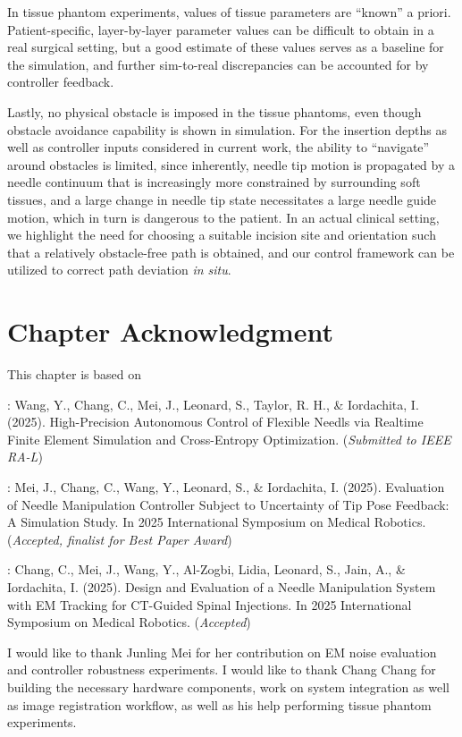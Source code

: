 In tissue phantom experiments, values of tissue parameters are ``known'' a priori. Patient-specific, layer-by-layer parameter values can be difficult to obtain in a real surgical setting, but a good estimate of these values serves as a baseline for the simulation, and further sim-to-real discrepancies can be accounted for by controller feedback.

Lastly, no physical obstacle is imposed in the tissue phantoms, even though obstacle avoidance capability is shown in simulation. For the insertion depths as well as controller inputs considered in current work, the ability to ``navigate'' around obstacles is limited, since inherently, needle tip motion is propagated by a needle continuum that is increasingly more constrained by surrounding soft tissues, and a large change in needle tip state necessitates a large needle guide motion, which in turn is dangerous to the patient. In an actual clinical setting, we highlight the need for choosing a suitable incision site and orientation such that a relatively obstacle-free path is obtained, and our control framework can be utilized to correct path deviation \textit{in situ}.

\section{Chapter Acknowledgment}
\label{sec:chap-5-ack}

This chapter is based on

\parencite{wangHighPrecisionAutonomousControl2025}: Wang, Y., Chang, C., Mei, J., Leonard, S., Taylor, R. H., \& Iordachita, I. (2025). High-Precision Autonomous Control of Flexible Needls via Realtime Finite Element Simulation and Cross-Entropy Optimization. (\textit{Submitted to IEEE RA-L})

\parencite{meiEvaluationNeedleManipulation2025}: Mei, J., Chang, C., Wang, Y., Leonard, S., \& Iordachita, I. (2025). Evaluation of Needle Manipulation Controller Subject to Uncertainty of Tip Pose Feedback: A Simulation Study. In 2025 International Symposium on Medical Robotics. (\textit{Accepted, finalist for Best Paper Award})

\parencite{changDesignEvaluationNeedle2025}: Chang, C., Mei, J., Wang, Y., Al-Zogbi, Lidia, Leonard, S., Jain, A., \& Iordachita, I. (2025). Design and Evaluation of a Needle Manipulation System with EM Tracking for CT-Guided Spinal Injections. In 2025 International Symposium on Medical Robotics. (\textit{Accepted})

I would like to thank Junling Mei for her contribution on EM noise evaluation and controller robustness experiments. I would like to thank Chang Chang for building the necessary hardware components, work on system integration as well as image registration workflow, as well as his help performing tissue phantom experiments.

